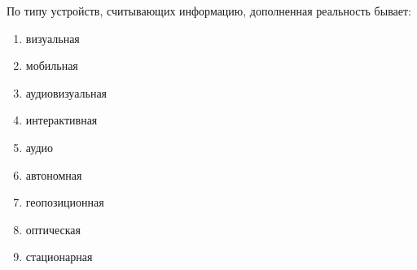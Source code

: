 
По типу устройств, считывающих информацию, дополненная реальность бывает:

\begin{enumerate}
    \item визуальная
    \item мобильная
    \item аудиовизуальная
    \item интерактивная
    \item аудио
    \item автономная
    \item геопозиционная
    \item оптическая
    \item стационарная
\end{enumerate}

